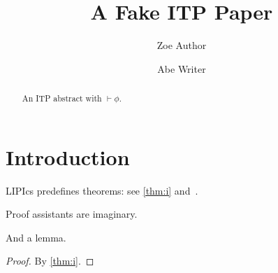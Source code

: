 \documentclass[a4paper,UKenglish,cleveref,autoref,thm-restate]{lipics-v2021}
\title{A Fake ITP Paper}
\author{Zoe Author}{Fake University, Nowhere}{z@example.org}{https://orcid.org/0000-0000-0000-0000}{}
\author{Abe Writer}{Another Institute, Elsewhere}{}{}{}
\begin{document}
\maketitle
\begin{abstract}
An ITP abstract with $\vdash \phi$.
\end{abstract}
\section{Introduction}\label{sec:intro}
LIPIcs predefines theorems: see \cref{thm:i} and~\cite{ItpA}.
\begin{theorem}\label{thm:i}
Proof assistants are imaginary.
\end{theorem}
\begin{lemma}[A helper]\label{lem:i}
And a lemma.
\end{lemma}
\begin{proof}
By \cref{thm:i}.
\end{proof}

\end{document}
